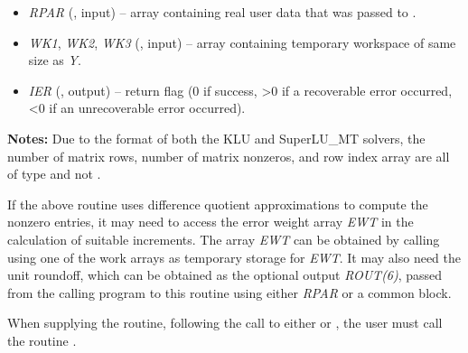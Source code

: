 \documentclass[letterpaper,10pt,english]{sphinxmanual}
\begin{document}
\begin{fulllineitems}
\begin{description}
\begin{itemize}
\item {} 
\emph{RPAR} (, input) -- array containing real user data that was passed to
{\hyperref[f_interface/Usage:f/_/FARKMALLOC]{\emph{}}}.

\item {} 
\emph{WK1}, \emph{WK2}, \emph{WK3}  (, input) -- array containing temporary workspace
of same size as \emph{Y}.

\item {} 
\emph{IER} (, output) -- return flag (0 if success, \textgreater{}0 if a recoverable error
occurred, \textless{}0 if an unrecoverable error occurred).

\end{itemize}

\end{description}

\textbf{Notes:} Due to the format of both the KLU and SuperLU\_MT
solvers, the number of matrix rows, number of matrix nonzeros, and
row index array are all of type  and not .

\end{fulllineitems}


If the above routine uses difference quotient approximations to
compute the nonzero entries, it may need to access the error weight
array \emph{EWT} in the calculation of suitable increments. The array \emph{EWT}
can be obtained by calling {\hyperref[f_interface/Optional_output:f/_/FARKGETERRWEIGHTS]{\emph{}}} using one of
the work arrays as temporary storage for \emph{EWT}.  It may also need the
unit roundoff, which can be obtained as the optional output \emph{ROUT(6)},
passed from the calling program to this routine using either \emph{RPAR} or
a common block.

When supplying the {\hyperref[f_interface/Usage:f/_/FARKSPJAC]{\emph{}}} routine, following the call
to either {\hyperref[f_interface/Usage:f/_/FARKKLU]{\emph{}}} or {\hyperref[f_interface/Usage:f/_/FARKSUPERLUMT]{\emph{}}}, the user
must call the routine {\hyperref[f_interface/Usage:f/_/FARKSPARSESETJAC]{\emph{}}}.
\end{document}
